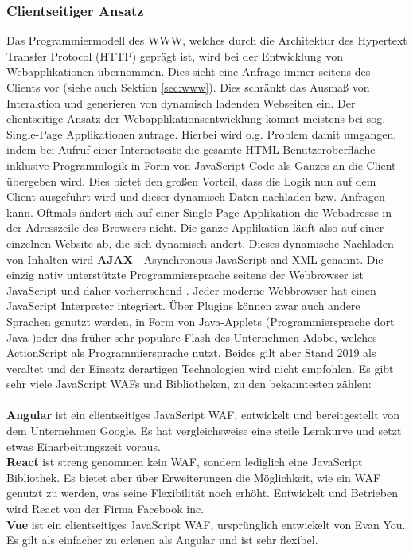 \subsubsection{Clientseitiger Ansatz}\label{sec:clientseitigeransatz}
 Das Programmiermodell des WWW, welches durch die Architektur des Hypertext Transfer Protocol (HTTP) geprägt ist, wird bei der Entwicklung von Webapplikationen übernommen. Dies sieht eine Anfrage immer seitens des Clients vor (siehe auch Sektion \ref{sec:www}). Dies schränkt das Ausmaß von Interaktion und generieren von dynamisch ladenden Webseiten ein. 
 Der clientseitige Ansatz der Webapplikationsentwicklung kommt meistens bei sog. Single-Page Applikationen zutrage. Hierbei wird o.g. Problem damit umgangen, indem bei Aufruf einer Internetseite die gesamte HTML Benutzeroberfläche inklusive Programmlogik in Form von JavaScript Code als Ganzes an die Client übergeben wird. Dies bietet den großen Vorteil, dass die Logik nun auf dem Client ausgeführt wird und dieser dynamisch Daten nachladen bzw. Anfragen kann. Oftmals ändert sich auf einer Single-Page Applikation die Webadresse in der Adresszeile des Browsers nicht. Die ganze Applikation läuft also auf einer einzelnen Website ab, die sich dynamisch ändert. Dieses dynamische Nachladen von Inhalten wird \textbf{AJAX} - Asynchronous JavaScript and XML genannt.  Die einzig nativ unterstützte Programmiersprache seitens der Webbrowser ist JavaScript und daher vorherrschend \cite{safran2011webtechnologien:article}.
 Jeder moderne Webbrowser hat einen JavaScript Interpreter integriert. Über Plugins können zwar auch andere Sprachen genutzt werden, in Form von Java-Applets (Programmiersprache dort Java )oder das früher sehr populäre Flash des Unternehmen Adobe, welches ActionScript als Programmiersprache nutzt. Beides gilt aber Stand 2019 als veraltet und der Einsatz derartigen Technologien wird nicht empfohlen. %
Es gibt sehr viele JavaScript WAFs und Bibliotheken, zu den bekanntesten zählen: \\ \\ 
 \textbf{Angular} ist ein clientseitiges JavaScript WAF, entwickelt und bereitgestellt von dem Unternehmen Google. Es hat vergleichsweise eine steile Lernkurve und setzt etwas Einarbeitungszeit voraus. \\ 
 \textbf{React} ist streng genommen kein WAF, sondern lediglich eine JavaScript Bibliothek. Es bietet aber über Erweiterungen die Möglichkeit, wie ein WAF genutzt zu werden, was seine Flexibilität noch erhöht. Entwickelt und Betrieben wird React von der Firma Facebook inc. \\
 \textbf{Vue} ist ein clientseitiges JavaScript WAF, ursprünglich entwickelt von Evan You. Es gilt als einfacher zu erlenen als Angular und ist sehr flexibel. \\
 
